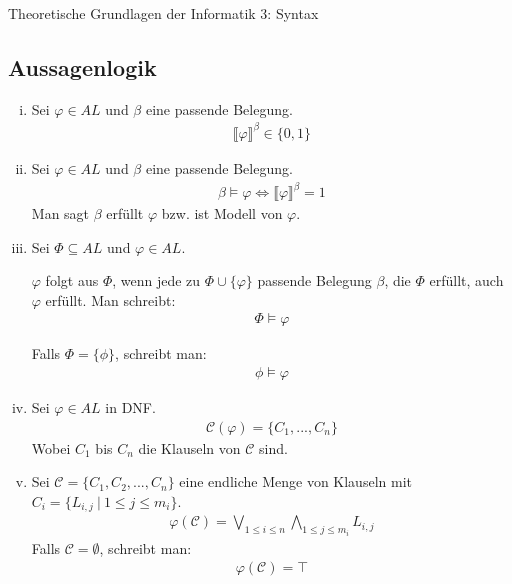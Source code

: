\documentclass[a4paper,10pt]{article}
\begin{document}
\begin{center}
\Large{Theoretische Grundlagen der Informatik 3: Syntax}
\end{center}
	\subsection*{Aussagenlogik}
	\begin{enumerate}[(i)]
		\item
			Sei $\varphi \in AL$ und $\beta$ eine passende Belegung.
			\begin{align*}
				\llbracket \varphi \rrbracket^{\beta} \in \{0,1\}
			\end{align*}
			
		\item
			Sei $\varphi \in AL$ und $\beta$ eine passende Belegung.
			\begin{align*}
				\beta \vDash \varphi \Leftrightarrow \llbracket \varphi \rrbracket^{\beta} = 1
			\end{align*}
			Man sagt $\beta$ erfüllt $\varphi$ bzw. ist Modell von $\varphi$.
			
		\item	
			Sei $\Phi \subseteq AL$ und $\varphi \in AL$.
			
			$\varphi$ folgt aus $\Phi$, wenn jede zu $\Phi \cup \{\varphi\}$ passende Belegung $\beta$, die $\Phi$
			erfüllt, auch $\varphi$ erfüllt. Man schreibt:
			\begin{align*}
				\Phi \vDash \varphi 
			\end{align*}
			
			Falls $\Phi = \{\phi\}$, schreibt man:
			\begin{align*}
				\phi \vDash \varphi 
			\end{align*}
		\item
			Sei $\varphi \in AL$ in DNF.
			\begin{align*}
				\mathcal{C}(\varphi) = \{C_1,...,C_n\}
			\end{align*}
			Wobei $C_1$ bis $C_n$ die Klauseln von $\mathcal{C}$ sind.
			
		\item
			Sei $\mathcal{C} = \{C_1,C_2,...,C_n\}$ eine endliche Menge von Klauseln mit $C_i = \{L_{i,j} ~|~ 1 \leq j \leq m_i \}$.
			\begin{align*}
				\varphi(\mathcal{C}) = \bigvee\limits_{1 \leq i \leq n} \bigwedge\limits_{1 \leq j \leq m_i} L_{i,j}
			\end{align*}
			Falls $\mathcal{C} = \emptyset$, schreibt man:
			\begin{align*}
				\varphi(\mathcal{C}) = \top
			\end{align*}
			

\end{enumerate}
\end{document}

